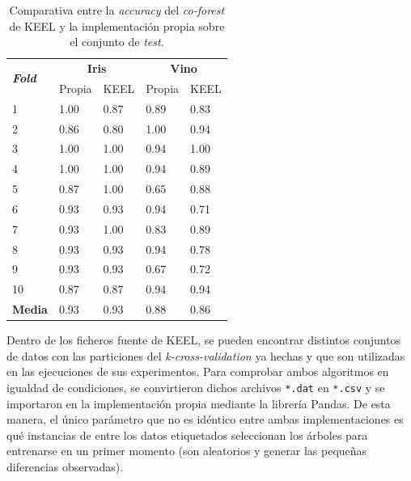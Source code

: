 \begin{table}
	\begin{centering}
		
		\begin{tabular}{@{} p{4em} p{5em} p{7em} p{7em} p{7em} @{}}
			\toprule
			\multirow{2}{*}{\textbf{\textit{ \hfil Fold}}} & \multicolumn{2}{c}{\hfil \textbf{Iris}}& \multicolumn{2}{c}{\hfil \textbf{Vino}} \\
			\cmidrule{2-3} \cmidrule{4-5}
			& \hfil Propia & \hfil KEEL & \hfil Propia & \hfil KEEL\\ 
			\toprule
			\hfil 1 &\hfil 1.00	&\hfil 0.87	& \hfil 0.89  & \hfil0.83 \\
			\hfil 2 &\hfil 0.86	&\hfil 0.80	& \hfil 1.00 	&  \hfil 0.94 \\
			\hfil 3 & \hfil 1.00	& \hfil 1.00	& \hfil 0.94	& \hfil 1.00 \\
			\hfil 4 & \hfil 1.00	& \hfil 1.00	& \hfil 0.94	& \hfil 0.89 \\
			\hfil 5 & \hfil 0.87	& \hfil 1.00	& \hfil 0.65	& \hfil 0.88 \\
			\hfil 6 & \hfil 0.93	& \hfil 0.93	& \hfil 0.94	& \hfil 0.71 \\
			\hfil 7 & \hfil 0.93	& \hfil 1.00	& \hfil 0.83	& \hfil 0.89 \\
			\hfil 8 & \hfil 0.93	& \hfil 0.93	& \hfil 0.94	& \hfil 0.78 \\
			\hfil 	9 & \hfil 0.93	& \hfil 0.93	& \hfil 0.67	& \hfil 0.72 \\
			\hfil 10& \hfil 0.87	& \hfil 0.87	& \hfil 0.94	& \hfil 0.94 \\
			\midrule
			\hfil \textbf{Media} 			& \hfil 0.93	& \hfil 0.93	& \hfil 0.88	& \hfil 0.86 \\
			\bottomrule
		\end{tabular}
	\end{centering}
	\caption[\textit{Co-forest}: comparativa entre KEEL y la implementación propia]{Comparativa entre la \textit{accuracy} del \textit{co-forest} de KEEL y la implementación propia sobre el conjunto de \textit{test}.}
	\label{tabla_coforest_keelvsnuestro}	
\end{table}

Dentro de los ficheros fuente de KEEL, se pueden encontrar distintos conjuntos de datos con las particiones del \textit{k-cross-validation} ya hechas y que son utilizadas en las ejecuciones de sus experimentos. Para comprobar ambos algoritmos en igualdad de condiciones, se convirtieron dichos archivos \texttt{*.dat} en \texttt{*.csv} y se importaron en la implementación propia mediante la librería Pandas. De esta manera, el único parámetro que no es idéntico entre ambas implementaciones es qué instancias de entre los datos etiquetados seleccionan los árboles para entrenarse en un primer momento (son aleatorios y generar las pequeñas diferencias observadas).

